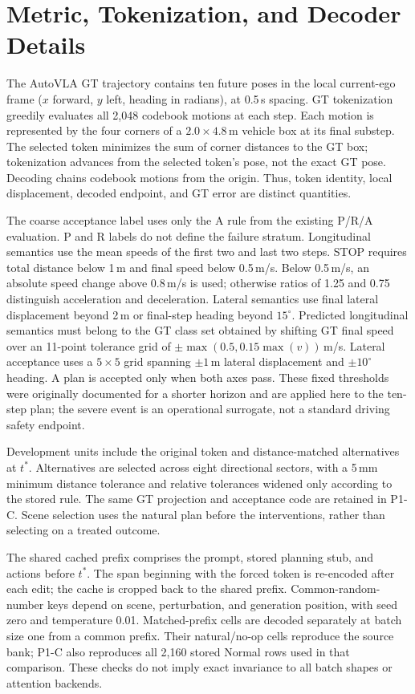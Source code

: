 \section{Metric, Tokenization, and Decoder Details}
\label{app:metric}
The AutoVLA GT trajectory contains ten future poses in the local current-ego frame ($x$ forward, $y$ left, heading in radians), at 0.5\,s spacing. GT tokenization greedily evaluates all 2,048 codebook motions at each step. Each motion is represented by the four corners of a $2.0\times4.8$\,m vehicle box at its final substep. The selected token minimizes the sum of corner distances to the GT box; tokenization advances from the selected token's pose, not the exact GT pose. Decoding chains codebook motions from the origin. Thus, token identity, local displacement, decoded endpoint, and GT error are distinct quantities.

The coarse acceptance label uses only the A rule from the existing P/R/A evaluation. P and R labels do not define the failure stratum. Longitudinal semantics use the mean speeds of the first two and last two steps. STOP requires total distance below 1\,m and final speed below 0.5\,m/s. Below 0.5\,m/s, an absolute speed change above 0.8\,m/s is used; otherwise ratios of 1.25 and 0.75 distinguish acceleration and deceleration. Lateral semantics use final lateral displacement beyond 2\,m or final-step heading beyond $15^\circ$. Predicted longitudinal semantics must belong to the GT class set obtained by shifting GT final speed over an 11-point tolerance grid of $\pm\max(0.5,0.15\max(v))$\,m/s. Lateral acceptance uses a $5\times5$ grid spanning $\pm1$\,m lateral displacement and $\pm10^\circ$ heading. A plan is accepted only when both axes pass. These fixed thresholds were originally documented for a shorter horizon and are applied here to the ten-step plan; the severe event is an operational surrogate, not a standard driving safety endpoint.

Development units include the original token and distance-matched alternatives at $t^*$. Alternatives are selected across eight directional sectors, with a 5\,mm minimum distance tolerance and relative tolerances widened only according to the stored rule. The same GT projection and acceptance code are retained in P1-C. Scene selection uses the natural plan before the interventions, rather than selecting on a treated outcome.

The shared cached prefix comprises the prompt, stored planning stub, and actions before $t^*$. The span beginning with the forced token is re-encoded after each edit; the cache is cropped back to the shared prefix. Common-random-number keys depend on scene, perturbation, and generation position, with seed zero and temperature 0.01. Matched-prefix cells are decoded separately at batch size one from a common prefix. Their natural/no-op cells reproduce the source bank; P1-C also reproduces all 2,160 stored Normal rows used in that comparison. These checks do not imply exact invariance to all batch shapes or attention backends.

